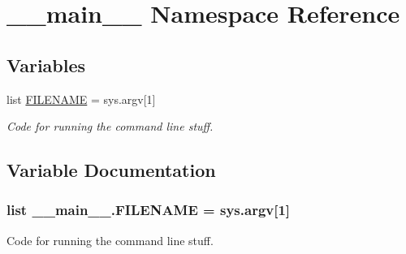 \hypertarget{namespace____main____}{\section{\-\_\-\-\_\-main\-\_\-\-\_\- Namespace Reference}
\label{namespace____main____}
}
\subsection*{Variables}
\begin{DoxyCompactItemize}
\item 
list \hyperlink{namespace____main_____a60e0b299451a8e14940f59935c617486}{F\-I\-L\-E\-N\-A\-M\-E} = sys.\-argv\mbox{[}1\mbox{]}
\begin{DoxyCompactList}\small\item\em Code for running the command line stuff. \end{DoxyCompactList}\end{DoxyCompactItemize}


\subsection{Variable Documentation}
\hypertarget{namespace____main_____a60e0b299451a8e14940f59935c617486}{
\subsubsection[{F\-I\-L\-E\-N\-A\-M\-E}]{\setlength{\rightskip}{0pt plus 5cm}list \-\_\-\-\_\-main\-\_\-\-\_\-.\-F\-I\-L\-E\-N\-A\-M\-E = sys.\-argv\mbox{[}1\mbox{]}}}\label{namespace____main_____a60e0b299451a8e14940f59935c617486}


Code for running the command line stuff. 

